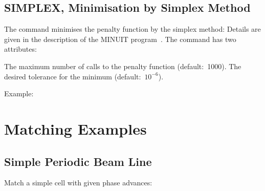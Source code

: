 \subsection{SIMPLEX, Minimisation by Simplex Method}
The  command minimises the penalty
function by the simplex method:
Details are given in the description of the MINUIT program~\cite{B-JAM71}.
The command has two attributes:
\begin{mylist}
The maximum number of calls to the penalty function (default:~1000).
The desired tolerance for the minimum (default:~\(10^{-6}\)).
\end{mylist}
Example:
 
\section{Matching Examples}
\label{S-MATEX}
 
\subsection{Simple Periodic Beam Line}
Match a simple cell with given phase advances:
